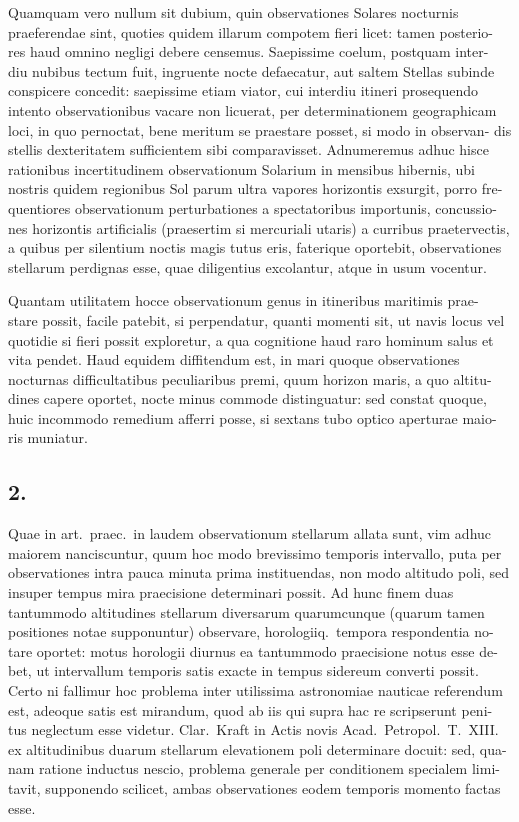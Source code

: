 \documentclass[12pt,a4paper]{article}
\begin{document}
Quamquam vero nullum sit dubium, quin observationes Solares nocturnis
praeferendae sint, quoties quidem illarum compotem fieri licet: tamen posterio-
res haud omnino negligi debere censemus. Saepissime coelum, postquam inter-
diu nubibus tectum fuit, ingruente nocte defaecatur, aut saltem Stellas subinde
conspicere concedit: saepissime etiam viator, cui interdiu itineri prosequendo
intento observationibus vacare non licuerat, per determinationem geographicam
loci, in quo pernoctat, bene meritum se praestare posset, si modo in observan-
dis stellis dexteritatem sufficientem sibi comparavisset. Adnumeremus adhuc
hisce rationibus incertitudinem observationum Solarium in mensibus hibernis, ubi
nostris quidem regionibus Sol parum ultra vapores horizontis exsurgit, porro fre-
quentiores observationum perturbationes a spectatoribus importunis, concussio-
nes horizontis artificialis (praesertim si mercuriali utaris) a curribus praetervectis,
a quibus per silentium noctis magis tutus eris, faterique oportebit, observationes
stellarum perdignas esse, quae diligentius excolantur, atque in usum vocentur.

Quantam utilitatem hocce observationum genus in itineribus maritimis prae-
stare possit, facile patebit, si perpendatur, quanti momenti sit, ut navis locus
vel quotidie si fieri possit exploretur, a qua cognitione haud raro hominum salus
et vita pendet. Haud equidem diffitendum est, in mari quoque observationes
nocturnas difficultatibus peculiaribus premi, quum horizon maris, a quo altitu-
dines capere oportet, nocte minus commode distinguatur: sed constat quoque,
huic incommodo remedium afferri posse, si sextans tubo optico aperturae maio-
ris muniatur.

\subsection*{2.}

Quae in art.\ praec.\ in laudem observationum stellarum allata sunt, vim
adhuc maiorem nanciscuntur, quum hoc modo brevissimo temporis intervallo,
puta per observationes intra pauca minuta prima instituendas, non modo altitudo
poli, sed insuper tempus mira praecisione determinari possit. Ad hunc finem
duas tantummodo altitudines stellarum diversarum quarumcunque (quarum tamen
positiones notae supponuntur) observare, horologiiq.\ tempora respondentia no-
tare oportet: motus horologii diurnus ea tantummodo praecisione notus esse de-
bet, ut intervallum temporis satis exacte in tempus sidereum converti possit.
Certo ni fallimur hoc problema inter utilissima astronomiae nauticae referendum
est, adeoque satis est mirandum, quod ab iis qui supra hac re scripserunt peni-
tus neglectum esse videtur. Clar.\ Kraft in Actis novis Acad.\ Petropol.\ T.~XIII.
ex altitudinibus duarum stellarum elevationem poli determinare docuit: sed, qua-
nam ratione inductus nescio, problema generale per conditionem specialem limi-
tavit, supponendo scilicet, ambas observationes eodem temporis momento factas
esse.
\end{document}
